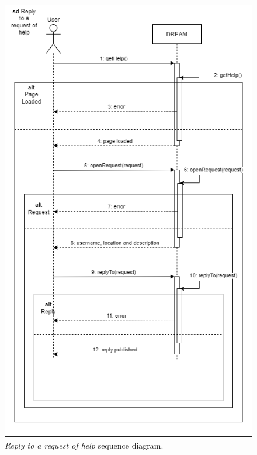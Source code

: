\begin{figure}[H]
    \centering
    \includegraphics[height=1.5\linewidth]{Images/Use Case/UC7.png}
    \caption{\textit{Reply to a request of help} sequence diagram.}
\end{figure}
\newpage

